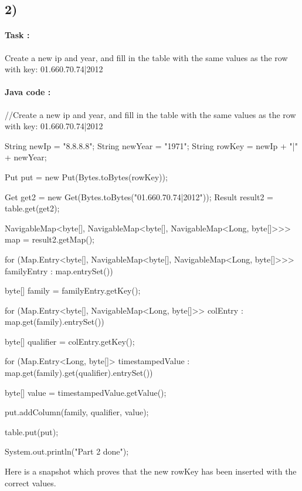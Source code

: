\documentclass[a4paper,11pt]{report}
\begin{document}
\subsection*{2)}

\paragraph{Task : } Create a new ip and year, and fill in the table with the same values as the row with key:
01.660.70.74|2012

\paragraph{Java code : }

\begin{javacode}
//Create a new ip and year, and fill in the table with the same values as the row with key: 01.660.70.74|2012

String newIp = "8.8.8.8";
String newYear = "1971";
String rowKey = newIp + "|" + newYear;

Put put = new Put(Bytes.toBytes(rowKey));

Get get2 = new Get(Bytes.toBytes("01.660.70.74|2012"));
Result result2 = table.get(get2);

NavigableMap<byte[], NavigableMap<byte[], NavigableMap<Long, byte[]>>> map = result2.getMap();

for (Map.Entry<byte[], NavigableMap<byte[], NavigableMap<Long, byte[]>>> familyEntry : map.entrySet()) {

    byte[] family = familyEntry.getKey();

    for (Map.Entry<byte[], NavigableMap<Long, byte[]>> colEntry : map.get(family).entrySet()) {

        byte[] qualifier = colEntry.getKey();

        for (Map.Entry<Long, byte[]> timestampedValue : map.get(family).get(qualifier).entrySet()) {

            byte[] value = timestampedValue.getValue();

            put.addColumn(family, qualifier, value);

        }
    }

}

table.put(put);

System.out.println("Part 2 done");
\end{javacode}

Here is a snapshot which proves that the new rowKey has been inserted with the
correct values.
\end{document}

